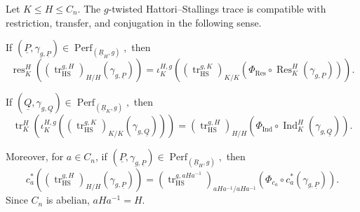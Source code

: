 \documentclass[11pt,oneside]{amsart}
\DeclareMathOperator{\res}{res}
\DeclareMathOperator{\Perf}{Perf}
\DeclareMathOperator{\tr}{tr}
\numberwithin{equation}{section}
\numberwithin{figure}{section}
\theoremstyle{plain}
\theoremstyle{definition}
\theoremstyle{remark}
\begin{document}
\begin{prop}\label{prop:twisted-HS-Mackey-operations}
Let \(K\le H\le C_n\). The \(g\)-twisted Hattori--Stallings trace is
compatible with restriction, transfer, and conjugation in the following sense.

If
\(
(\underline P,\gamma_{g,\underline P})\in
\Perf_{(\underline R_H,g)},
\)
then
\[
\res_K^H
\left(
(\tr_{\mathrm{HS}}^{g,H})_{H/H}
(\gamma_{g,\underline P})
\right)
=
\iota_K^{H,g}
\left(
(\tr_{\mathrm{HS}}^{g,K})_{K/K}
\left(
\Phi_{\operatorname{Res}}\circ
\operatorname{Res}_K^H(\gamma_{g,\underline P})
\right)
\right).
\]

If
\(
(\underline Q,\gamma_{g,\underline Q})\in
\Perf_{(\underline R_K,g)},
\)
then
\[
\tr_K^H
\left(
\iota_K^{H,g}
\left(
(\tr_{\mathrm{HS}}^{g,K})_{K/K}
(\gamma_{g,\underline Q})
\right)
\right)
=
(\tr_{\mathrm{HS}}^{g,H})_{H/H}
\left(
\Phi_{\operatorname{Ind}}\circ
\operatorname{Ind}_K^H(\gamma_{g,\underline Q})
\right).
\]

Moreover, for \(a\in C_n\), if
\(
(\underline P,\gamma_{g,\underline P})\in
\Perf_{(\underline R_H,g)},
\)
then
\[
c_a^*
\left(
(\tr_{\mathrm{HS}}^{g,H})_{H/H}
(\gamma_{g,\underline P})
\right)
=
(\tr_{\mathrm{HS}}^{g,aHa^{-1}})_{aHa^{-1}/aHa^{-1}}
\left(
\Phi_{c_a}\circ c_a^*(\gamma_{g,\underline P})
\right).
\]
Since \(C_n\) is abelian, \(aHa^{-1}=H\).
\end{prop}
\end{document}
